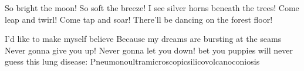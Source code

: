 %
%
%

So bright the moon! So soft the breeze!
I see silver horns beneath the trees!
Come leap and twirl! Come tap and soar!
There'll be dancing on the forest floor!

I'd like to make myself believe
Because my dreams are bursting at the seams
Never gonna give you up! Never gonna let you down!
bet you puppies will never guess this lung disease: Pneumonoultramicroscopicsilicovolcanoconiosis

